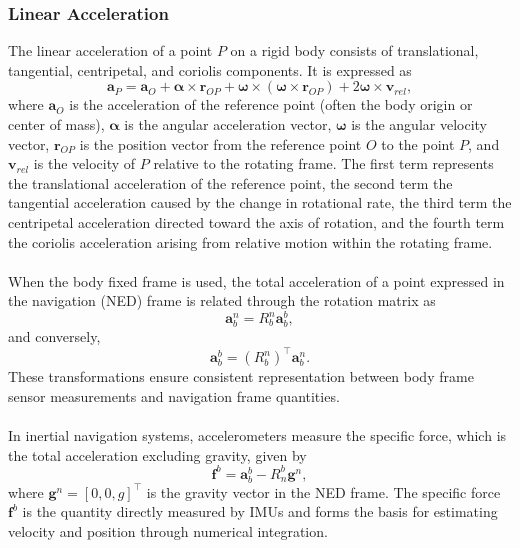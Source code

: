 \subsubsection{Linear Acceleration}
The linear acceleration of a point $P$ on a rigid body consists of translational, tangential, centripetal, and coriolis components. It is expressed as
$$
    \mathbf{a}_P =
    \mathbf{a}_O
    + \boldsymbol{\alpha} \times \mathbf{r}_{OP}
    + \boldsymbol{\omega} \times (\boldsymbol{\omega} \times \mathbf{r}_{OP})
    + 2\boldsymbol{\omega} \times \mathbf{v}_{rel},
$$
where $\mathbf{a}_O$ is the acceleration of the reference point (often the body origin or center of mass), $\boldsymbol{\alpha}$ is the angular acceleration vector, $\boldsymbol{\omega}$ is the angular velocity vector, $\mathbf{r}_{OP}$ is the position vector from the reference point $O$ to the point $P$, and $\mathbf{v}_{rel}$ is the velocity of $P$ relative to the rotating frame. The first term represents the translational acceleration of the reference point, the second term the tangential acceleration caused by the change in rotational rate, the third term the centripetal acceleration directed toward the axis of rotation, and the fourth term the coriolis acceleration arising from relative motion within the rotating frame.  
\\ \\
When the body fixed frame is used, the total acceleration of a point expressed in the navigation (NED) frame is related through the rotation matrix as
$$
    \mathbf{a}_b^n = R_b^n \mathbf{a}_b^b,
$$
and conversely,
$$
    \mathbf{a}_b^b = (R_b^n)^\top \mathbf{a}_b^n.
$$
These transformations ensure consistent representation between body frame sensor measurements and navigation frame quantities.  
\\ \\
In inertial navigation systems, accelerometers measure the specific force, which is the total acceleration excluding gravity, given by
$$
    \mathbf{f}^b = \mathbf{a}_b^b - R_n^b \mathbf{g}^n,
$$
where $\mathbf{g}^n = [0, 0, g]^\top$ is the gravity vector in the NED frame. The specific force $\mathbf{f}^b$ is the quantity directly measured by IMUs and forms the basis for estimating velocity and position through numerical integration.

